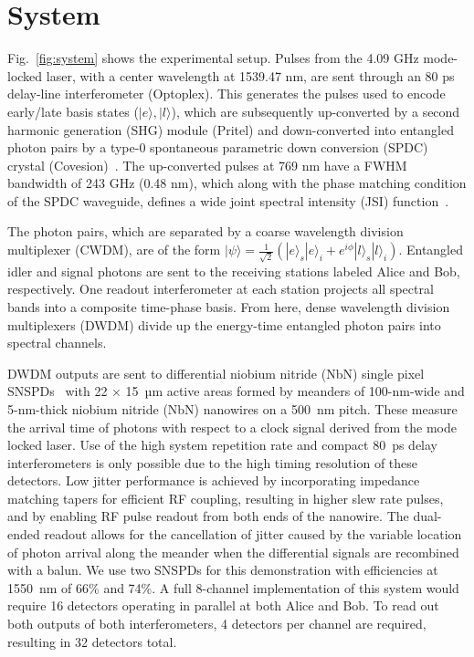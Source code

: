 \documentclass[11pt]{caltech_thesis} %
\begin{document}
\hypertarget{system}{%
\section{System}\label{system}}

Fig.~\ref{fig:system} shows the experimental setup. Pulses from the 4.09 GHz mode-locked laser, with a center wavelength at 1539.47 nm, are sent through an 80 ps delay-line interferometer (Optoplex). This generates the pulses used to encode early/late basis states ($|e\rangle,|l\rangle$), which are subsequently up-converted by a second harmonic generation (SHG) module (Pritel) and down-converted into entangled photon pairs by a type-0 spontaneous parametric down conversion (SPDC) crystal (Covesion)~\autocite{Marcikic2002}. The up-converted pulses at 769 nm have a FWHM bandwidth of 243 GHz (0.48 nm), which along with the phase matching condition of the SPDC waveguide, defines a wide joint spectral intensity (JSI) function~\autocite{kim2005measurement}.

The photon pairs, which are separated by a coarse wavelength division multiplexer (CWDM), are of the form $|\psi\rangle=\frac{1}{\sqrt{2}}\left(|e\rangle_{s}|e\rangle_{i}+e^{i \phi}|l\rangle_{s}|l\rangle_{i}\right)$. Entangled idler and signal photons are sent to the receiving stations labeled Alice and Bob, respectively. One readout interferometer at each station projects all spectral bands into a composite time-phase basis. From here, dense wavelength division multiplexers (DWDM) divide up the energy-time entangled photon pairs into spectral channels.

DWDM outputs are sent to differential niobium nitride (NbN) single pixel SNSPDs~\autocite{Colangelo2023} with 22 × 15~µm active areas formed by meanders of 100-nm-wide and 5-nm-thick niobium nitride (NbN) nanowires on a 500~nm pitch. These measure the arrival time of photons with respect to a clock signal derived from the mode locked laser. Use of the high system repetition rate and compact 80~ps delay interferometers is only possible due to the high timing resolution of these detectors. Low jitter performance is achieved by incorporating impedance matching tapers for efficient RF coupling, resulting in higher slew rate pulses, and by enabling RF pulse readout from both ends of the nanowire. The dual-ended readout allows for the cancellation of jitter caused by the variable location of photon arrival along the meander when the differential signals are recombined with a balun. We use two SNSPDs for this demonstration with efficiencies at 1550~nm of 66\% and 74\%. A full 8-channel implementation of this system would require 16 detectors operating in parallel at both Alice and Bob. To read out both outputs of both interferometers, 4 detectors per channel are required, resulting in 32 detectors total.
\end{document}
